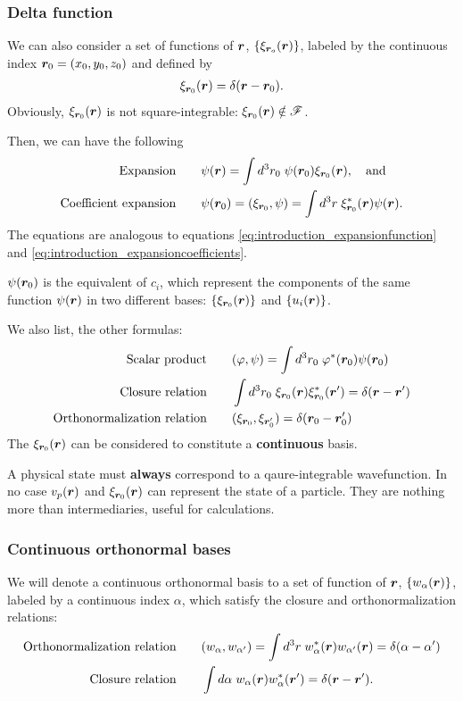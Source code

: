 \subsubsection{Delta function}
We can also consider a set of functions of $\bm{r}$, $\{\xi_{\bm{r}_o}(\bm{r})\}$, labeled by the continuous index $\bm{r}_0=(x_0,y_0,z_0)$ and defined by
\begin{align}
    \xi_{\bm{r}_0}(\bm{r})=\delta(\bm{r}-\bm{r}_0).
\end{align}
Obviously, $\xi_{\bm{r}_0}(\bm{r})$ is not square-integrable: $\xi_{\bm{r}_0}(\bm{r})\notin\mathscr{F}$.

Then, we can have the following
\begin{align}
    \text{Expansion}&\qquad\psi(\bm{r})=\int d^3r_0\;\psi(\bm{r}_0)\xi_{\bm{r}_0}(\bm{r}),\quad\text{and}\\
    \text{Coefficient expansion}&\qquad\psi(\bm{r}_0)=(\xi_{\bm{r}_0},\psi)=\int d^3r\;\xi^*_{\bm{r}_0}(\bm{r})\psi(\bm{r}).
\end{align}
The equations are analogous to equations \eqref{eq:introduction_expansionfunction} and \eqref{eq:introduction_expansioncoefficients}.
\begin{emphasizer}
    $\psi(\bm{r}_0)$ is the equivalent of $c_i$, which represent the components of the same function $\psi(\bm{r})$ in two different bases: $\{\xi_{\bm{r}_0}(\bm{r})\}$ 
    and $\{u_i(\bm{r})\}$.
\end{emphasizer}
We also list, the other formulas:
\begin{align}
    \text{Scalar product}&\qquad(\varphi,\psi)=\int d^3r_0\;\varphi^*(\bm{r}_0)\psi(\bm{r}_0)\\
    \text{Closure relation}&\qquad\int d^3r_0\;\xi_{\bm{r}_0}(\bm{r})\xi^*_{\bm{r}_0}(\bm{r}')=\delta(\bm{r}-\bm{r}')\\
    \text{Orthonormalization relation}&\qquad (\xi_{\bm{r}_0},\xi_{\bm{r}'_0})=\delta(\bm{r}_0-\bm{r}'_0)
\end{align}
The $\xi_{\bm{r}_0}(\bm{r})$ can be considered to constitute a \textbf{continuous} basis.

\begin{emphasizer}
    A physical state must \textbf{always} correspond to a qaure-integrable wavefunction. In no case $v_p(\bm{r})$ and $\xi_{\bm{r}_0}(\bm{r})$ can represent the state of a 
    particle. They are nothing more than intermediaries, useful for calculations.
\end{emphasizer}
\subsubsection{Continuous orthonormal bases}
We will denote a continuous orthonormal basis to a set of function of $\bm{r}$, $\{w_\alpha(\bm{r})\}$, labeled by a continuous index $\alpha$, which satisfy the 
closure and orthonormalization relations:
\begin{align}
    \text{Orthonormalization relation}&\qquad(w_\alpha,w_{\alpha'})=\int d^3r\;w^*_\alpha(\bm{r})w_{\alpha'}(\bm{r})=\delta(\alpha-\alpha')\\
    \text{Closure relation}&\qquad\int d\alpha\;w_\alpha(\bm{r})w^*_\alpha(\bm{r}')=\delta(\bm{r}-\bm{r}').
\end{align}

